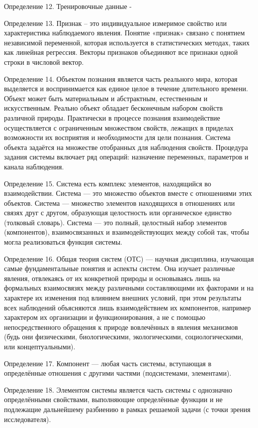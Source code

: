 Определение 12. Тренировочные данные - 

Определение 13. Признак – это индивидуальное измеримое свойство или характеристика наблюдаемого явления. Понятие «признак» связано с понятием независимой переменной, которая используется в статистических методах, таких как линейная регрессия. Векторы признаков объединяют все признаки одной строки в числовой вектор.

Определение 14. Объектом познания является часть реального мира, которая выделяется и воспринимается как единое целое в течение длительного времени. Объект может быть материальным и абстрактным, естественным и искусственным. Реально объект обладает бесконечным набором свойств различной природы. Практически в процессе познания взаимодействие осуществляется с ограниченным множеством свойств, лежащих в приделах возможности их восприятия и необходимости для цели познания. Система объекта задаётся на множестве отобранных для наблюдения свойств. Процедура задания системы включает ряд операций: назначение переменных, параметров и канала наблюдения.

Определение 15. Система есть комплекс элементов, находящийся во взаимодействии.
Система — это множество объектов вместе с отношениями этих объектов.
Система — множество элементов находящихся в отношениях или связях друг с другом, образующая целостность или органическое единство (толковый словарь). Система — это полный, целостный набор элементов (компонентов), взаимосвязанных и взаимодействующих между собой так, чтобы могла реализоваться функция системы.

Определение 16. Общая теория систем (ОТС) — научная дисциплина, изучающая самые фундаментальные понятия и аспекты систем. Она изучает различные явления, отвлекаясь от их конкретной природы и основываясь лишь на формальных взаимосвязях между различными составляющими их факторами и на характере их изменения под влиянием внешних условий, при этом результаты всех наблюдений объясняются лишь взаимодействием их компонентов, например характером их организации и функционирования, а не с помощью непосредственного обращения к природе вовлечённых в явления механизмов (будь они физическими, биологическими, экологическими, социологическими, или концептуальными).

Определение 17. Компонент — любая часть системы, вступающая в определённые отношения с другими частями (подсистемами, элементами).

Определение 18. Элементом системы является часть системы с однозначно определёнными свойствами, выполняющие определённые функции и не подлежащие дальнейшему разбиению в рамках решаемой задачи (с точки зрения исследователя).

